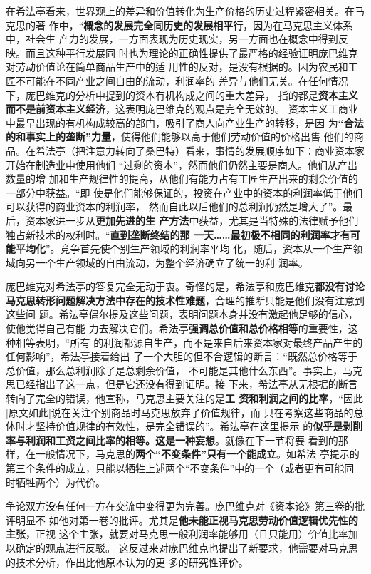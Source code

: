 在希法亭看来，世界观上的差异和价值转化为生产价格的历史过程紧密相关。在马克思的著
作中，“\textbf{概念的发展完全同历史的发展相平行}，因为在马克思主义体系中，社会生
产力的发展，一方面表现为历史现实，另一方面也在概念中得到反映。而且这种平行发展同
时也为理论的正确性提供了最严格的经验证明庞巴维克对劳动价值论在简单商品生产中的适
用性的反对，是没有根据的。因为农民和工匠不可能在不同产业之间自由的流动，利润率的
差异与他们无关。在任何情况下，庞巴维克的分析中提到的资本有机构成之间的重大差异，
指的都是\textbf{资本主义而不是前资本主义经济}，这表明庞巴维克的观点是完全无效的。
资本主义工商业中最早出现的有机构成较高的部门，吸引了商人向产业生产的转移，是因
为\textbf{“合法的和事实上的垄断”力量}，使得他们能够以高于他们劳动价值的价格出售
他们的商品。在希法亭（把注意力转向了桑巴特）看来，事情的发展顺序如下：商业资本家
开始在制造业中使用他们 “过剩的资本”，然而他们仍然主要是商人。他们从产出数量的增
加和生产规律性的提高，从他们有能力占有工匠生产出来的剩余价值的一部分中获益。“即
使是他们能够保证的，投资在产业中的资本的利润率低于他们可以获得的商业资本的利润率，
然而自此以后他们的总利润仍然是增大了”。最后，资本家进一步从\textbf{更加先进的生
  产方法}中获益，尤其是当特殊的法律赋予他们独占新技术的权利时。“\textbf{直到垄断终结的那
一天……最初极不相同的利润率才有可能平均化}”。竞争首先使个别生产领域的利润率平均
化，随后，资本从一个生产领域向另一个生产领域的自由流动，为整个经济确立了统一的利
润率。

庞巴维克对希法亭的答复完全无动于衷。奇怪的是，希法亭和庞巴维克\textbf{都没有讨论
  马克思转形问题解决方法中存在的技术性难题}，合理的推断只能是他们没有注意到这些问
题。希法亭偶尔提及这些问题，表明问题本身并没有激起他足够的信心，使他觉得自己有能
力去解决它们。希法亭\textbf{强调总价值和总价格相等}的重要性，这种相等表明，“所有
的利润都源自生产，而不是来自后来资本家对最终产品产生的任何影响”，希法亭接着给出
了一个大胆的但不合逻辑的断言：“既然总价格等于总价值，那么总利润除了是总剩余价值，
不可能是其他什么东西”。事实上，马克思已经指出了这一点，但是它还没有得到证明。接
下来，希法亭从无根据的断言转向了完全的错误，他宣称，马克思主要关注的是\textbf{工
  资和利润之间的比率}，“因此[原文如此]说在关注个别商品时马克思放弃了价值规律，而
只在考察这些商品的总体时才坚持价值规律的有效性，是完全错误的”。希法亭在这里提示
的\textbf{似乎是剥削率与利润和工资之间比率的相等。这是一种妄想}。就像在下一节将要
看到的那样，在一般情况下，马克思的\textbf{两个“不变条件”只有一个能成立}。如希法
亭提示的第三个条件的成立，只能以牺牲上述两个“不变条件”中的一个（或者更有可能同
时牺牲两个）为代价。

争论双方没有任何一方在交流中变得更为完善。庞巴维克对《资本论》第三卷的批评明显不
如他对第一卷的批评。尤其是\textbf{他未能正视马克思劳动价值逻辑优先性的主张}，正视
这个主张，就要对马克思一般利润率能够用（且只能用）价值比率加以确定的观点进行反驳。
这反过来对庞巴维克也提出了新要求，他需要对马克思的技术分析，作出比他原本认为的更
多的研究性评价。
\vfill

